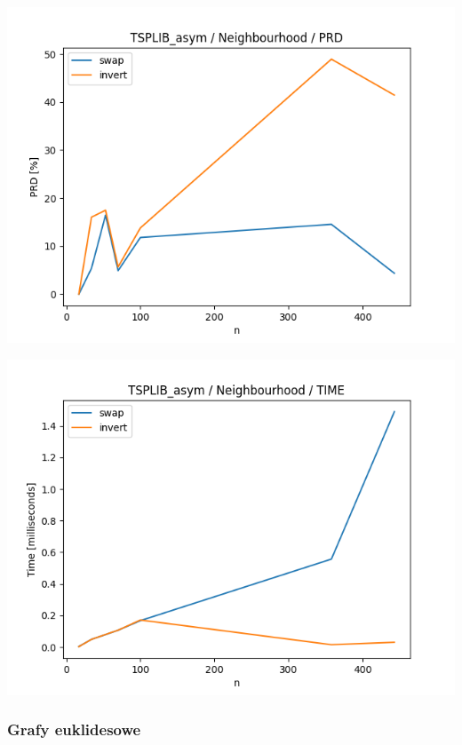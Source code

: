 \documentclass{article}
\begin{document}
\begin{center}
\includegraphics[width=\textwidth, 
                   height = 0.4\textheight, 
                   keepaspectratio]
                  {plots/neighbours_tsplib_asym_prd} 
\end{center}

\begin{center}
\includegraphics[width=\textwidth, 
                   height = 0.4\textheight, 
                   keepaspectratio]
                  {plots/neighbours_tsplib_asym_time} 
\end{center}

\subsubsection{Grafy euklidesowe}
\end{document}
